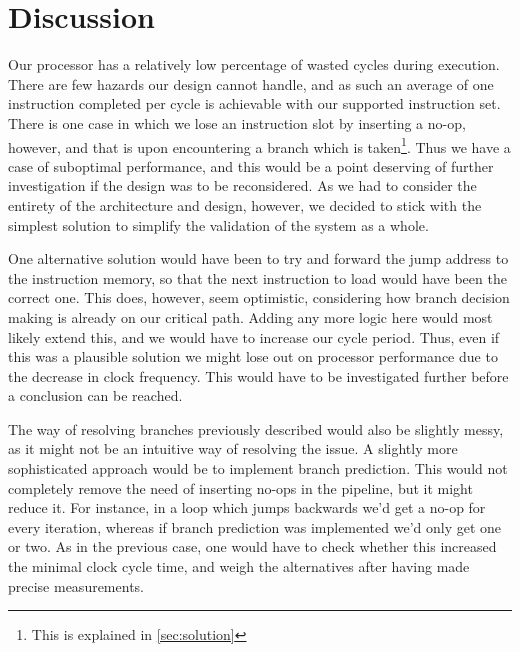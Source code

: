 \documentclass[11pt]{article}
\begin{document}
\section{Discussion}
\label{sec:discussion}
Our processor has a relatively low percentage of wasted cycles during
execution. There are few hazards our design cannot handle, and as such
an average of one instruction completed per cycle is achievable with
our supported instruction set. There is one case in which we lose an
instruction slot by inserting a no-op, however, and that is upon
encountering a branch which is taken\footnote{This is explained in
  \autoref{sec:solution}}. Thus we have a case of suboptimal
performance, and this would be a point deserving of further
investigation if the design was to be reconsidered. As we had to
consider the entirety of the architecture and design, however, we
decided to stick with the simplest solution to simplify the validation
of the system as a whole.

One alternative solution would have been to try and forward the jump
address to the instruction memory, so that the next instruction to
load would have been the correct one. This does, however, seem
optimistic, considering how branch decision making is already on our
critical path. Adding any more logic here would most likely extend
this, and we would have to increase our cycle period. Thus, even if
this was a plausible solution we might lose out on processor
performance due to the decrease in clock frequency. This would have to
be investigated further before a conclusion can be reached.

The way of resolving branches previously described would also be
slightly messy, as it might not be an intuitive way of resolving the
issue. A slightly more sophisticated approach would be to implement
branch prediction. This would not completely remove the need of
inserting no-ops in the pipeline, but it might reduce it. For
instance, in a loop which jumps backwards we'd get a no-op for every
iteration, whereas if branch prediction was implemented we'd only get
one or two. As in the previous case, one would have to check whether
this increased the minimal clock cycle time, and weigh the
alternatives after having made precise measurements. 

\newline{}
\end{document}
